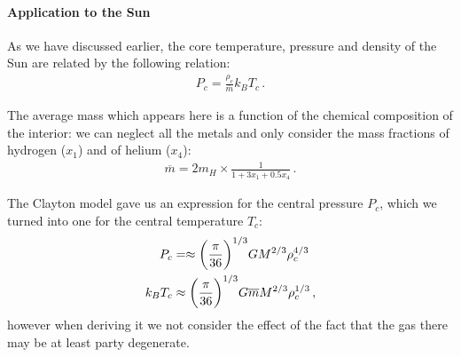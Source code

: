 \documentclass[main.tex]{subfiles}
\begin{document}



\paragraph{Application to the Sun}

As we have discussed earlier, the core temperature, pressure and density of the Sun are related by the following relation:
%
\begin{align}
  P_c = \frac{\rho _c}{\overline{m}} k_B T_c
\,.
\end{align}

The average mass which appears here is a function of the chemical composition of the interior: we can neglect all the metals and only consider the mass fractions of hydrogen (\(x_1 \)) and of helium (\(x_4 \)): 
%
\begin{align}
  \overline{m} = 2 m_H \times \frac{1}{1 + 3x_1 + 0.5 x_4}
\,.
\end{align}
%


The Clayton model gave us an expression for the central pressure \(P_c\), which we turned into one for the central temperature \(T_c\): 
%
\begin{align}
P_c &=\approx \qty(\frac{\pi }{36})^{1/3} G M^{2/3} \rho _c^{4/3} \\
 k_B T_c &\approx \qty(\frac{\pi }{36})^{1/3} G \overline{m}
  M^{2/3} \rho _c^{1/3}
\,,
\end{align}
%
however when deriving it we not consider the effect of the fact that the gas there may be at least party degenerate.
\end{document}
